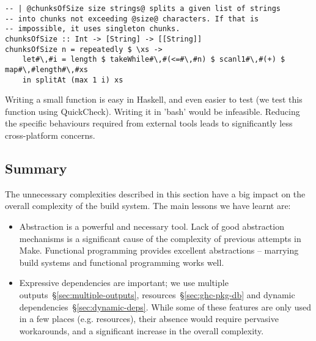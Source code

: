 \begin{lstlisting}
-- | @chunksOfSize size strings@ splits a given list of strings
-- into chunks not exceeding @size@ characters. If that is
-- impossible, it uses singleton chunks.
chunksOfSize :: Int -> [String] -> [[String]]
chunksOfSize n = repeatedly $ \xs ->
    let#\,#i = length $ takeWhile#\,#(<=#\,#n) $ scanl1#\,#(+) $ map#\,#length#\,#xs
    in splitAt (max 1 i) xs
\end{lstlisting}

\noindent Writing a small function is easy in Haskell, and even easier to test
(we test this function using QuickCheck). Writing it in \lst'bash' would be infeasible.
Reducing the specific behaviours required from external tools leads to
significantly less cross-platform concerns.

\subsection{Summary}

The unnecessary complexities described in this section have a big impact on
the overall complexity of the build system. The main lessons we have learnt are:

\begin{itemize}
\item Abstraction is a powerful and necessary tool. Lack of good abstraction
mechanisms is a significant cause of the complexity of previous attempts in
Make. Functional programming provides excellent abstractions --
marrying build systems and functional programming works well.
\item Expressive dependencies are important; we use
multiple outputs~\S\ref{sec:multiple-outputs},
resources~\S\ref{sec:ghc-pkg-db} and dynamic dependencies~\S\ref{sec:dynamic-deps}.
While some of these
features are only used in a few places (e.g. resources), their absence would
require pervasive workarounds, and a significant increase in the overall complexity.
\end{itemize}

%
%
%
%
